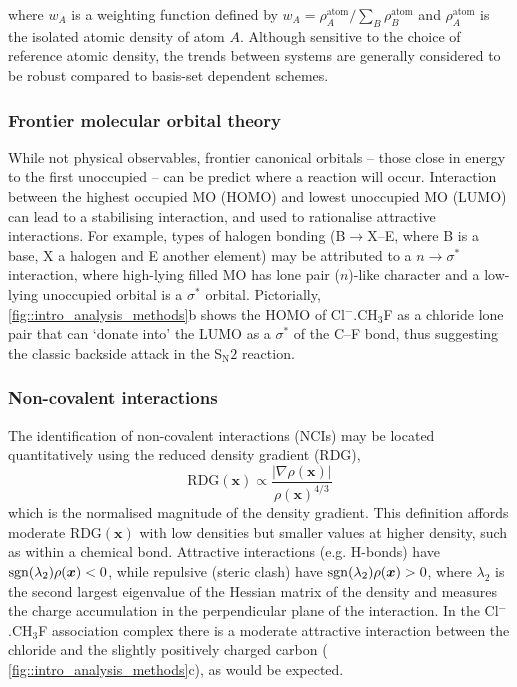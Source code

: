 \documentclass[main.tex]{subfiles}
\begin{document}
where $w_A$ is a weighting function defined by $w_A = \rho_A^\text{atom}/\sum_B \rho_B^\text{atom}$ and $\rho_A^\text{atom}$ is the isolated atomic density of atom $A$. Although sensitive to the choice of reference atomic density, the trends between systems are generally considered to be robust compared to basis-set dependent schemes.\cite{Saha2008}

	
\subsubsection{Frontier molecular orbital theory}

While not physical observables, frontier canonical orbitals -- those close in energy to the first unoccupied -- can be predict where a reaction will occur.\cite{Fukui1952, Woodward1969, Fukui1982} Interaction between the highest occupied MO (HOMO) and lowest unoccupied MO (LUMO) can lead to a stabilising interaction,\cite{albright2013orbital} and used to rationalise attractive interactions. For example, types of halogen bonding (B$\rightarrow$X--E, where B is a base, X a halogen and E another element) may be attributed to a $n\rightarrow \sigma^*$ interaction, where high-lying filled MO has lone pair ($n$)-like character and a low-lying unoccupied orbital is a $\sigma^*$ orbital.\cite{Cavallo2016} Pictorially, \figurename{ \ref{fig::intro_analysis_methods}b} shows the HOMO of Cl${}^{-}$.CH${}_3$F as a chloride lone pair that can `donate into' the LUMO as a $\sigma^*$ of the C--F bond, thus suggesting the classic backside attack in the S${}_\text{N}2$ reaction.

\subsubsection{Non-covalent interactions}

The identification of non-covalent interactions (NCIs) may be located quantitatively using the reduced density gradient (RDG),\cite{Johnson2010}
\begin{equation}
	\text{RDG}(\boldsymbol{x}) \propto \frac{|\nabla \rho(\boldsymbol{x})|}{\rho(\boldsymbol{x})^{4/3}}
\end{equation}
which is the normalised magnitude of the density gradient. This definition affords moderate $\text{RDG}(\boldsymbol{x})$ with low densities but smaller values at higher density, such as within a chemical bond. Attractive interactions (e.g. H-bonds) have $\operatorname{sgn}(\lambda_2)\rho(\boldsymbol{x})  < 0$, while repulsive (steric clash) have $\operatorname{sgn}(\lambda_2)\rho(\boldsymbol{x}) > 0$, where $\lambda_2$ is the second largest eigenvalue of the Hessian matrix of the density and measures the charge accumulation in the perpendicular plane of the interaction.\cite{Laplaza2020} In the Cl${}^{-}$.CH${}_3$F association complex there is a moderate attractive interaction between the chloride and the slightly positively charged carbon (\figurename{ \ref{fig::intro_analysis_methods}c}), as would be expected.
\end{document}
